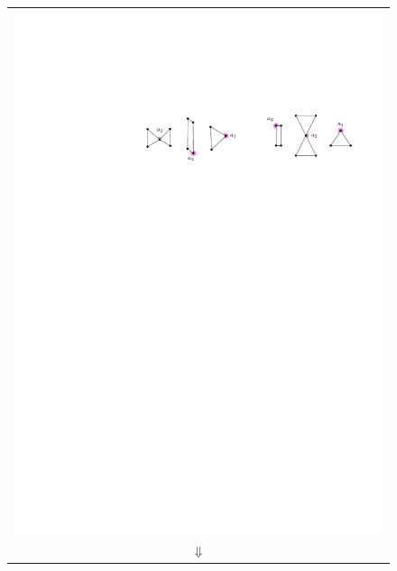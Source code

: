 \documentclass[11pt]{patmorin}
\begin{document}
\begin{figure}
\begin{center}
\begin{tabular}{c}
     \includegraphics{img/example-2} \\[2ex]
     $\Downarrow$ \\

\end{tabular}
\end{center}
\end{figure}
\end{document}
